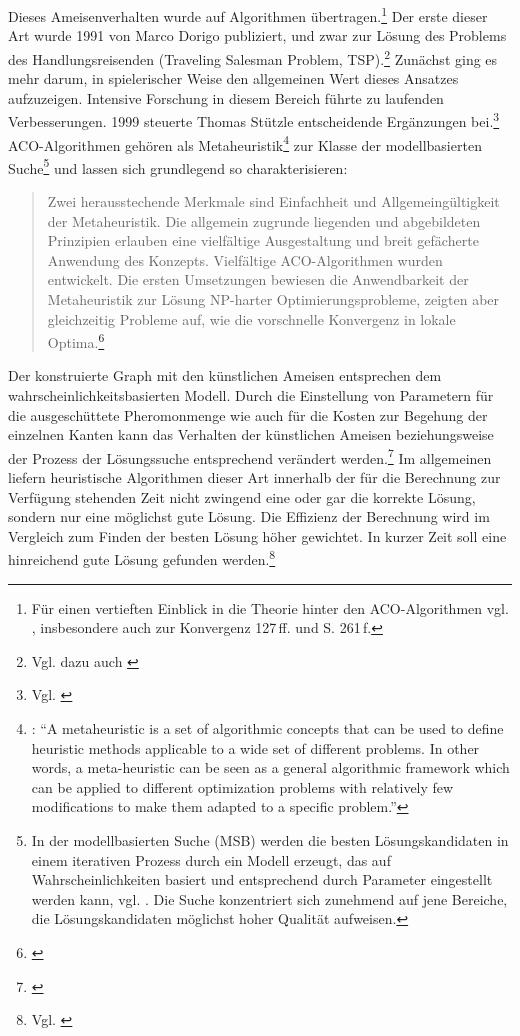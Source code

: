 Dieses Ameisenverhalten wurde auf Algorithmen übertragen.\footnote{Für einen vertieften Einblick in die Theorie hinter den ACO-Algorithmen vgl. \cite[S. 121\,ff.]{ds-ant}, insbesondere auch zur Konvergenz 127\,ff. und S. 261\,f.} Der erste dieser Art wurde 1991 von Marco Dorigo publiziert, und zwar zur Lösung des Problems des Handlungsreisenden (Traveling Salesman Problem, TSP).\footnote{Vgl. dazu auch \cite[S. 65\,ff.]{ds-ant}} Zunächst ging es mehr darum, in spielerischer Weise den allgemeinen Wert dieses Ansatzes aufzuzeigen. Intensive Forschung in diesem Bereich führte zu laufenden Verbesserungen. 1999 steuerte Thomas Stützle entscheidende Ergänzungen bei.\footnote{Vgl. \cite{ds-ant, wiki-antalg}} ACO-Algorithmen gehören als Metaheuristik\footnote{\cite[S. 62]{ds-ant}: \enquote{A metaheuristic is a set of algorithmic concepts that can be used to define heuristic methods applicable to a wide set of different problems. In other words, a meta-heuristic can be seen as a general algorithmic framework which can be applied to different optimization problems with relatively few modifications to make them adapted to a specific problem.}} zur Klasse der modellbasierten Suche\footnote{In der modellbasierten Suche (MSB) werden die besten Lösungskandidaten in einem iterativen Prozess durch ein Modell erzeugt, das auf Wahrscheinlichkeiten basiert und entsprechend durch Parameter eingestellt werden kann, vgl. \cite[S. 138\,ff.]{ds-ant}. Die Suche konzentriert sich zunehmend auf jene Bereiche, die Lösungskandidaten möglichst hoher Qualität aufweisen.} und lassen sich grundlegend so charakterisieren: \blockquote{Zwei herausstechende Merkmale sind Einfachheit und Allgemeingültigkeit der Metaheuristik. Die allgemein zugrunde liegenden und abgebildeten Prinzipien erlauben eine vielfältige Ausgestaltung und breit gefächerte Anwendung des Konzepts. Vielfältige ACO-Algorithmen wurden entwickelt. Die ersten Umsetzungen bewiesen die Anwendbarkeit der Metaheuristik zur Lösung NP-harter Optimierungsprobleme, zeigten aber gleichzeitig Probleme auf, wie die vorschnelle Konvergenz in lokale Optima.\footnote{\cite[S. 19]{sch-koa}}}

\noindent
Der konstruierte Graph mit den künstlichen Ameisen entsprechen dem wahrscheinlichkeitsbasierten Modell. Durch die Einstellung von Parametern für die ausgeschüttete Pheromonmenge wie auch für die Kosten zur Begehung der einzelnen Kanten kann das Verhalten der künstlichen Ameisen beziehungsweise der Prozess der Lösungssuche entsprechend verändert werden.\footnote{\cite[Vgl.][S. 151]{ds-ant}} Im allgemeinen liefern heuristische Algorithmen dieser Art innerhalb der für die Berechnung zur Verfügung stehenden Zeit nicht zwingend eine oder gar die korrekte Lösung, sondern nur eine möglichst gute Lösung. Die Effizienz der Berechnung wird im Vergleich zum Finden der besten Lösung höher gewichtet. In kurzer Zeit soll eine hinreichend gute Lösung gefunden werden.\footnote{Vgl. \cite[S. 25\,ff.]{ds-ant}}

